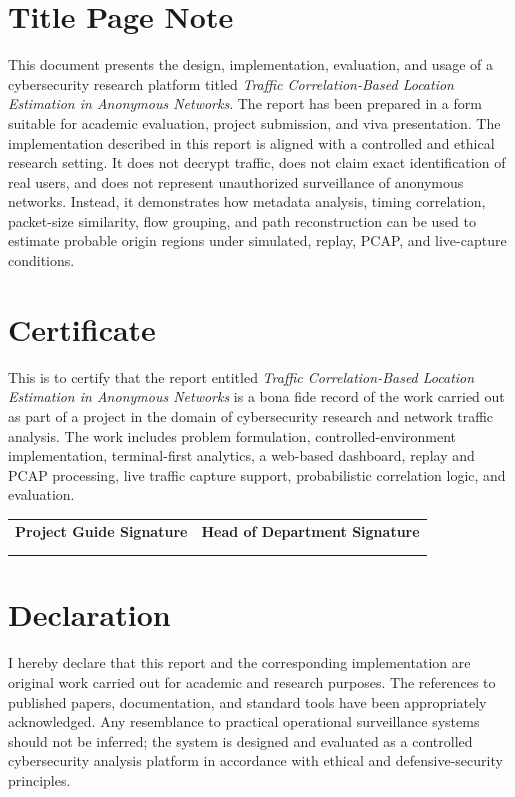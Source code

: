 \documentclass[12pt,a4paper]{report}
\begin{document}
\chapter*{Title Page Note}
This document presents the design, implementation, evaluation, and usage of a cybersecurity research platform titled \textit{Traffic Correlation-Based Location Estimation in Anonymous Networks}. The report has been prepared in a form suitable for academic evaluation, project submission, and viva presentation. The implementation described in this report is aligned with a controlled and ethical research setting. It does not decrypt traffic, does not claim exact identification of real users, and does not represent unauthorized surveillance of anonymous networks. Instead, it demonstrates how metadata analysis, timing correlation, packet-size similarity, flow grouping, and path reconstruction can be used to estimate probable origin regions under simulated, replay, PCAP, and live-capture conditions.

\chapter*{Certificate}
This is to certify that the report entitled \textit{Traffic Correlation-Based Location Estimation in Anonymous Networks} is a bona fide record of the work carried out as part of a project in the domain of cybersecurity research and network traffic analysis. The work includes problem formulation, controlled-environment implementation, terminal-first analytics, a web-based dashboard, replay and PCAP processing, live traffic capture support, probabilistic correlation logic, and evaluation.

\vspace{2cm}
\begin{tabularx}{\textwidth}{X X}
    \textbf{Project Guide Signature} & \textbf{Head of Department Signature} \\
    \\[2cm]
    \hrulefill & \hrulefill
\end{tabularx}

\chapter*{Declaration}
I hereby declare that this report and the corresponding implementation are original work carried out for academic and research purposes. The references to published papers, documentation, and standard tools have been appropriately acknowledged. Any resemblance to practical operational surveillance systems should not be inferred; the system is designed and evaluated as a controlled cybersecurity analysis platform in accordance with ethical and defensive-security principles.
\end{document}
